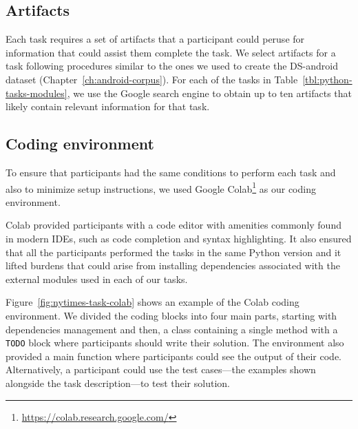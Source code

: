 







\subsection{Artifacts}
\label{cp6:experiment-artifacts}


Each task requires a set of artifacts that a participant could peruse for information that could assist them complete the task.
We select artifacts for a task following procedures similar to the ones we used to create the \acs{DS-android} dataset (Chapter~\ref{ch:android-corpus}). 
For each of the tasks in Table~\ref{tbl:python-tasks-modules}, we use the Google search engine to obtain up to ten artifacts that likely contain relevant
information for that task. 







\subsection{Coding environment}
\label{cp6:coding-environment}






To ensure that participants had the same conditions to perform each task
and also to minimize setup instructions, we used Google Colab\footnote{\url{https://colab.research.google.com/}} as our coding environment. 






Colab provided participants with a code editor with amenities commonly found in modern IDEs, such as code completion and syntax highlighting. It also ensured that all the participants 
performed the tasks in the same Python version and it lifted 
burdens that could arise from installing dependencies associated with the external modules used in each of our tasks. 



Figure~\ref{fig:nytimes-task-colab} shows an example of the Colab coding environment. 
We divided the coding blocks into four main parts, starting with dependencies management and then, 
a class containing a single method with a \texttt{TODO} block where 
participants should write their solution. 
The environment also provided a main function where participants could see the output
of their code. Alternatively, a participant could use the test cases---the examples shown alongside the task description---to test their solution.





